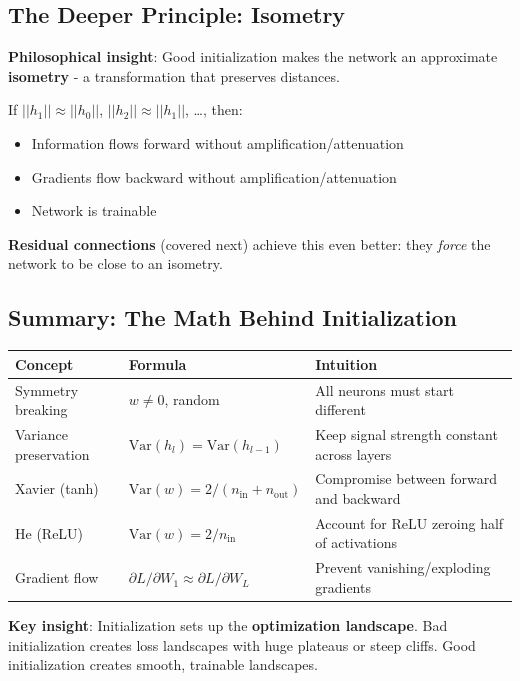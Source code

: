 \documentclass[11pt,oneside]{book}
\begin{document}
\subsection{The Deeper Principle: Isometry}

\textbf{Philosophical insight}: Good initialization makes the network an approximate \textbf{isometry} - a transformation that preserves distances.

If $||h_1|| \approx ||h_0||$, $||h_2|| \approx ||h_1||$, \ldots, then:
\begin{itemize}
\item Information flows forward without amplification/attenuation
\item Gradients flow backward without amplification/attenuation
\item Network is trainable
\end{itemize}

\textbf{Residual connections} (covered next) achieve this even better: they \textit{force} the network to be close to an isometry.

\subsection{Summary: The Math Behind Initialization}

\begin{table}[h]
\centering
\begin{tabular}{lll}
\toprule
\textbf{Concept} & \textbf{Formula} & \textbf{Intuition} \\
\midrule
Symmetry breaking & $w \neq 0$, random & All neurons must start different \\
Variance preservation & $\text{Var}(h_l) = \text{Var}(h_{l-1})$ & Keep signal strength constant across layers \\
Xavier (tanh) & $\text{Var}(w) = 2/(n_{\text{in}} + n_{\text{out}})$ & Compromise between forward and backward \\
He (ReLU) & $\text{Var}(w) = 2/n_{\text{in}}$ & Account for ReLU zeroing half of activations \\
Gradient flow & $\partial L/\partial W_1 \approx \partial L/\partial W_L$ & Prevent vanishing/exploding gradients \\
\bottomrule
\end{tabular}
\end{table}

\textbf{Key insight}: Initialization sets up the \textbf{optimization landscape}. Bad initialization creates loss landscapes with huge plateaus or steep cliffs. Good initialization creates smooth, trainable landscapes.
\end{document}
